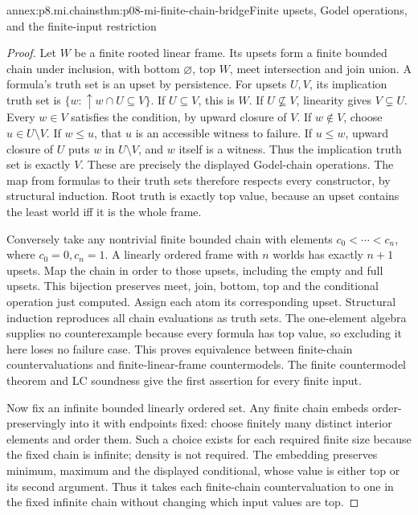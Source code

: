 \begin{annexitem}{annex:p8.mi.chains}{thm:p08-mi-finite-chain-bridge}{Finite upsets, Godel operations, and the finite-input restriction}
\begin{proof}
Let \(W\) be a finite rooted linear frame. Its upsets form a finite
bounded chain under inclusion, with bottom \(\varnothing\), top
\(W\), meet intersection and join union. A formula's truth set is an
upset by persistence. For upsets \(U,V\), its implication truth set
is \(\{w:\uparrow w\cap U\subseteq V\}\).
If \(U\subseteq V\), this is \(W\). If \(U\not\subseteq V\),
linearity gives \(V\subsetneq U\). Every \(w\in V\) satisfies
the condition, by upward closure of \(V\). If \(w\notin V\),
choose \(u\in U\setminus V\). If \(w\leq u\), that \(u\)
is an accessible witness to failure. If \(u\leq w\), upward
closure of \(U\) puts \(w\) in \(U\setminus V\), and \(w\)
itself is a witness. Thus the implication truth set is exactly \(V\).
These are precisely the displayed Godel-chain operations. The map
from formulas to their truth sets therefore respects every constructor,
by structural induction. Root truth is exactly top value, because
an upset contains the least world iff it is the whole frame.

Conversely take any nontrivial finite bounded chain with elements
\(c_0<\cdots<c_n\), where \(c_0=0,c_n=1\). A linearly ordered
frame with \(n\) worlds has exactly \(n+1\) upsets. Map the chain
in order to those upsets, including the empty and full upsets.
This bijection preserves meet, join, bottom, top and the conditional
operation just computed. Assign each atom its corresponding upset.
Structural induction reproduces all chain evaluations as truth sets.
The one-element algebra supplies no counterexample because every
formula has top value, so excluding it here loses no failure case.
This proves equivalence between finite-chain countervaluations and
finite-linear-frame countermodels. The finite countermodel theorem and
LC soundness give the first assertion for every finite input.

Now fix an infinite bounded linearly ordered set. Any finite chain embeds
order-preservingly into it with endpoints fixed: choose finitely many
distinct interior elements and order them. Such a choice exists for
each required finite size because the fixed chain is infinite; density
is not required. The embedding preserves minimum, maximum and the
displayed conditional, whose value is either top or its second argument.
Thus it takes each finite-chain countervaluation to one in the fixed
infinite chain without changing which input values are top.


\end{proof}
\end{annexitem}
